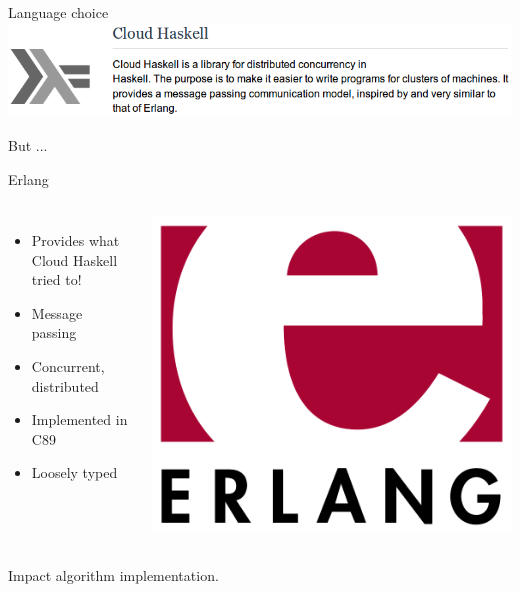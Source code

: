 \documentclass[14pt]{beamer}
\begin{document}
\begin{frame}{Language choice}
    \pause
    \includegraphics[width=\textwidth]{images/cloudhaskell.png}
    \pause
    \vspace{1cm}

    But ...
\end{frame}

\begin{frame}{Erlang}
    \begin{columns}
        \begin{itemize}
            \item<1> Provides what Cloud Haskell tried to!
            \item<1> Message passing
            \item<1> Concurrent, distributed
            \item<1> Implemented in C89
            \item Loosely typed
        \end{itemize}
        \includegraphics[width=\textwidth]{images/erlang-logo.pdf}
    \end{columns}
    \pause
    \vspace{2cm}
    Impact algorithm implementation.
\end{frame}
\end{document}
